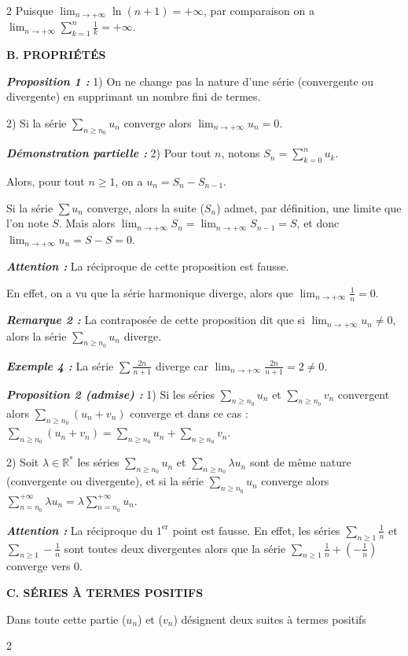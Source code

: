\documentclass[10pt,a4paper]{article}
\begin{document}
\begin{multicols}{2}
Puisque $\lim_{n \to +\infty} \ln(n+1) = +\infty$, par comparaison on a $\lim_{n \to +\infty} \sum_{k=1}^n \frac{1}{k} = +\infty$.

\vspace{0.1cm}
\textbf{\textcolor{maingreen}{B. PROPRIÉTÉS}}

\textbf{\textit{Proposition 1 :}} 1) On ne change pas la nature d'une série (convergente ou divergente) en supprimant un nombre fini de termes.

2) Si la série $\sum_{n \ge n_0} u_n$ converge alors $\lim_{n \to +\infty} u_n = 0$.

\textbf{\textit{Démonstration partielle :}} 2) Pour tout $n$, notons $S_n = \sum_{k=0}^n u_k$.

Alors, pour tout $n \ge 1$, on a $u_n = S_n - S_{n-1}$.

Si la série $\sum u_n$ converge, alors la suite ($S_n$) admet, par définition, une limite que l'on note $S$. Mais alors $\lim_{n \to +\infty} S_n = \lim_{n \to +\infty} S_{n-1} = S$, et donc $\lim_{n \to +\infty} u_n = S - S = 0$.

\textbf{\textit{Attention :}} La réciproque de cette proposition est fausse.

En effet, on a vu que la série harmonique diverge, alors que $\lim_{n \to +\infty} \frac{1}{n} = 0$.

\textbf{\textit{Remarque 2 :}} La contraposée de cette proposition dit que si $\lim_{n \to +\infty} u_n \ne 0$, alors la série $\sum_{n \ge n_0} u_n$ diverge.

\textbf{\textit{Exemple 4 :}} La série $\sum \frac{2n}{n+1}$ diverge car $\lim_{n \to +\infty} \frac{2n}{n+1} = 2 \ne 0$.

\textbf{\textit{Proposition 2 (admise) :}} 1) Si les séries $\sum_{n \ge n_0} u_n$ et $\sum_{n \ge n_0} v_n$ convergent alors $\sum_{n \ge n_0} (u_n + v_n)$ converge et dans ce cas : $\sum_{n \ge n_0} (u_n + v_n) = \sum_{n \ge n_0} u_n + \sum_{n \ge n_0} v_n$.

2) Soit $\lambda \in \mathbb{R}^*$ les séries $\sum_{n \ge n_0} u_n$ et $\sum_{n \ge n_0} \lambda u_n$ sont de même nature (convergente ou divergente), et si la série $\sum_{n \ge n_0} u_n$ converge alors $\sum_{n=n_0}^{+\infty} \lambda u_n = \lambda \sum_{n=n_0}^{+\infty} u_n$.

\textbf{\textit{Attention :}} La réciproque du $1^{\text{er}}$ point est fausse. En effet, les séries $\sum_{n \ge 1} \frac{1}{n}$ et $\sum_{n \ge 1} -\frac{1}{n}$ sont toutes deux divergentes alors que la série $\sum_{n \ge 1} \frac{1}{n} + \left(-\frac{1}{n}\right)$ converge vers 0.

\vspace{0.1cm}
\textbf{\textcolor{maingreen}{C. SÉRIES À TERMES POSITIFS}}

Dans toute cette partie ($u_n$) et ($v_n$) désignent deux suites à termes positifs

\vfill
\centerline{\footnotesize 2}

\end{multicols}
\end{document}
